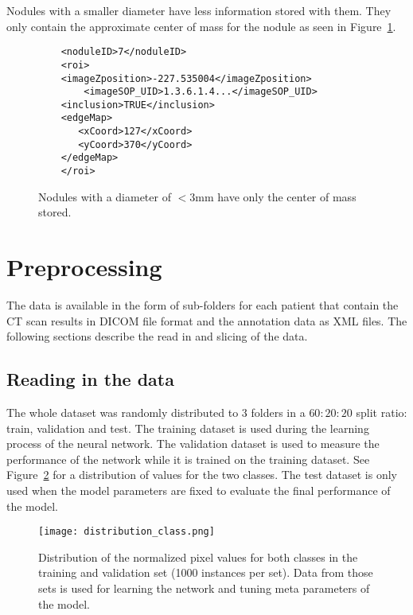 \documentclass[../Thesis.tex]{subfiles}
\begin{document}
Nodules with a smaller diameter have less information stored with them. They only contain the approximate center of mass for the nodule as seen in Figure~\ref{fig:smallNod}.

\begin{figure}
\begin{lstlisting}
	<noduleID>7</noduleID>
	<roi>
	<imageZposition>-227.535004</imageZposition>
        <imageSOP_UID>1.3.6.1.4...</imageSOP_UID>
	<inclusion>TRUE</inclusion>
	<edgeMap>
	   <xCoord>127</xCoord>
	   <yCoord>370</yCoord>
	</edgeMap>
	</roi>
\end{lstlisting}
\caption{Nodules with a diameter of $<3$mm have only the center of mass stored.}
\label{fig:smallNod}
\end{figure}

\section{Preprocessing}
The data is available in the form of sub-folders for each patient that contain the CT scan results in DICOM file format and the annotation data as XML files. The following sections describe the read in and slicing of the data.

\subsection{Reading in the data}
The whole dataset was randomly distributed to 3 folders in a $60:20:20$ split ratio: train, validation and test. The training dataset is used during the learning process of the neural network. The validation dataset is used to measure the performance of the network while it is trained on the training dataset. See Figure~\ref{fig:ttdist} for a distribution of values for the two classes. The test dataset is only used when the model parameters are fixed to evaluate the final performance of the model.
 
\begin{figure}
\texttt{[image: distribution\_class.png]}
\caption{Distribution of the normalized pixel values for both classes in the training and validation set (1000 instances per set). Data from those sets is used for learning the network and tuning meta parameters of the model.}
\label{fig:ttdist}
\end{figure}
\end{document}
